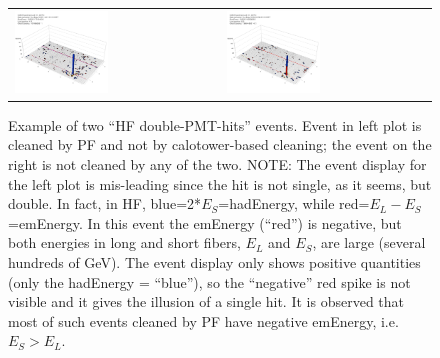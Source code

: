 %
\begin{figure}[h]
 \centering
 \begin{tabular}{ll}
   \includegraphics[width=0.47\textwidth]{fig/HFdoubleHit.png} &
   \includegraphics[width=0.47\textwidth]{fig/HFdoubleHit_1.png} \\
 \end{tabular}
\caption{Example of two ``HF double-PMT-hits'' events. Event in left plot is cleaned by PF and not by 
calotower-based cleaning; the event on the right is not cleaned by any of the two. 
NOTE: The event display for the left plot is mis-leading since the hit is not single, 
as it seems, but double. In fact, in HF, blue=2*$E_{S}$=hadEnergy, while red=$E_{L}-E_{S}$=emEnergy. 
In this event the emEnergy (``red'') is negative, but both energies in long and short fibers, $E_{L}$ and $E_{S}$, are large
(several hundreds of GeV). The event display only shows positive quantities 
(only the hadEnergy = ``blue''), so the ``negative'' red spike is not visible and it gives the illusion of a single hit. 
It is observed that most of such events cleaned by PF have negative emEnergy, i.e. $E_S>E_L$.}
\label{fig:HFdoublehits}
\end{figure}

